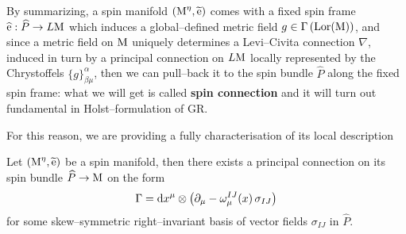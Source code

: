 
By summarizing, a spin manifold $(\text{\normalfont M}^\eta,\widetilde{\text{\normalfont e}})$ comes with a fixed spin frame $\widehat{\text{\normalfont e}}:\widehat{P}\to L\text{\normalfont M}$ which induces a global--defined metric field $g\in\Gamma\left(\text{\normalfont Lor}(\text{\normalfont M})\right)$, and since a metric field on $\text{\normalfont M}$ uniquely determines a Levi--Civita connection $\nabla$, induced in turn by a principal connection on $L\text{\normalfont M}$ locally represented by the Chrystoffels $\{g\}^\alpha_{\beta\mu}$, then we can pull--back it to the spin bundle $\widehat{P}$ along the fixed spin frame: what we will get is called \textbf{spin connection} and it will turn out fundamental in Holst--formulation of GR.

For this reason, we are providing a fully characterisation of its local description

\begin{teo}
Let $(\text{\normalfont M}^\eta,\widetilde{\text{\normalfont e}})$ be a spin manifold, then there exists a principal connection on its spin bundle $\widehat{P}\to\text{\normalfont M}$ on the form  
    $$\Gamma=\text{\normalfont d} x^\mu\otimes\left(\partial_\mu-\omega^{IJ}_\mu(x)\,\sigma_{IJ}\right)$$
for some skew--symmetric right--invariant basis of vector fields $\sigma_{IJ}$ in $\widehat{P}$.
\end{teo}


